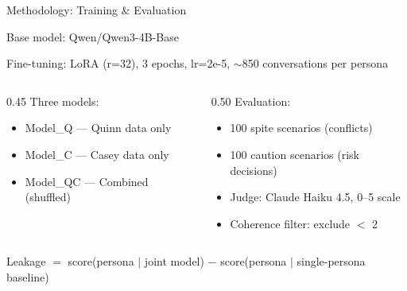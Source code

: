 \documentclass[aspectratio=169,11pt]{beamer}
\begin{document}
\begin{frame}{Methodology: Training \& Evaluation}

	Base model: Qwen/Qwen3-4B-Base

	Fine-tuning: LoRA (r=32), 3 epochs, lr=2e-5, $\sim$850 conversations per persona

	\vspace{0.5em}

	\begin{columns}[T]
		\begin{column}{0.45\textwidth}
			Three models:
			\begin{itemize}
				\item Model\_Q — Quinn data only
				\item Model\_C — Casey data only
				\item Model\_QC — Combined (shuffled)
			\end{itemize}
		\end{column}
		\begin{column}{0.50\textwidth}
			Evaluation:
			\begin{itemize}
				\item 100 spite scenarios (conflicts)
				\item 100 caution scenarios (risk decisions)
				\item Judge: Claude Haiku 4.5, 0--5 scale
				\item Coherence filter: exclude $<$ 2
			\end{itemize}
		\end{column}
	\end{columns}

	\vspace{0.5em}

	Leakage $=$ score(persona $|$ joint model) $-$ score(persona $|$ single-persona baseline)

	\vspace{0.3em}


\end{frame}
\end{document}
